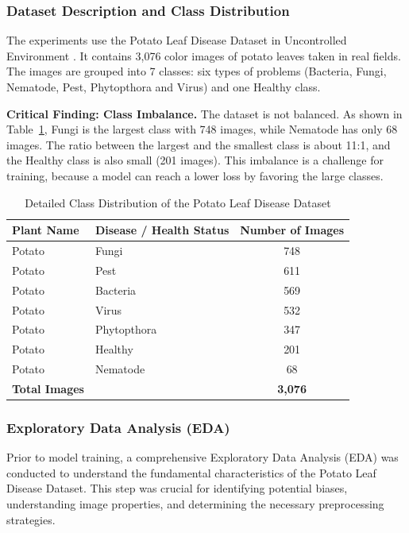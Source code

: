 \subsubsection{Dataset Description and Class Distribution}
The experiments use the Potato Leaf Disease Dataset in Uncontrolled Environment \cite{shabrina2024novel}. It contains 3,076 color images of potato leaves taken in real fields. The images are grouped into 7 classes: six types of problems (Bacteria, Fungi, Nematode, Pest, Phytopthora and Virus) and one Healthy class.

\textbf{Critical Finding: Class Imbalance.} The dataset is not balanced. As shown in Table~\ref{tab:class_dist}, Fungi is the largest class with 748 images, while Nematode has only 68 images. The ratio between the largest and the smallest class is about 11:1, and the Healthy class is also small (201 images). This imbalance is a challenge for training, because a model can reach a lower loss by favoring the large classes.

\begin{table}[htbp]
\caption{Detailed Class Distribution of the Potato Leaf Disease Dataset}
\label{tab:class_dist}
\begin{center}
\begin{tabularx}{0.85\textwidth}{| X | X | c |}
\hline
\textbf{Plant Name} & \textbf{Disease / Health Status} & \textbf{Number of Images} \\
\hline
Potato & Fungi & 748 \\
\hline
Potato & Pest & 611 \\
\hline
Potato & Bacteria & 569 \\
\hline
Potato & Virus & 532 \\
\hline
Potato & Phytopthora & 347 \\
\hline
Potato & Healthy & 201 \\
\hline
Potato & Nematode & 68 \\
\hline
\textbf{Total Images} & & \textbf{3,076} \\
\hline
\end{tabularx}
\end{center}
\end{table}

\subsubsection{Exploratory Data Analysis (EDA)}
Prior to model training, a comprehensive Exploratory Data Analysis (EDA) was conducted to understand the fundamental characteristics of the Potato Leaf Disease Dataset. This step was crucial for identifying potential biases, understanding image properties, and determining the necessary preprocessing strategies.


